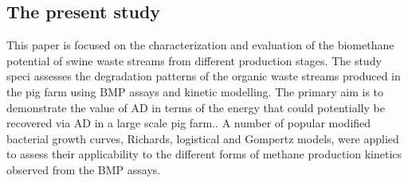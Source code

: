 \subsection{The present study}
This paper is focused on the characterization and evaluation of the biomethane potential of swine waste streams from different production stages. The study speci assesses the degradation patterns of the organic waste streams produced in the pig farm using BMP assays and kinetic modelling. The primary aim is to demonstrate the value of AD in terms of the energy that could potentially be recovered via AD in a large scale pig farm.. A number of popular modified bacterial growth curves, Richards, logistical and Gompertz models, were applied to assess their applicability to the different forms of methane production kinetics observed from the BMP assays.